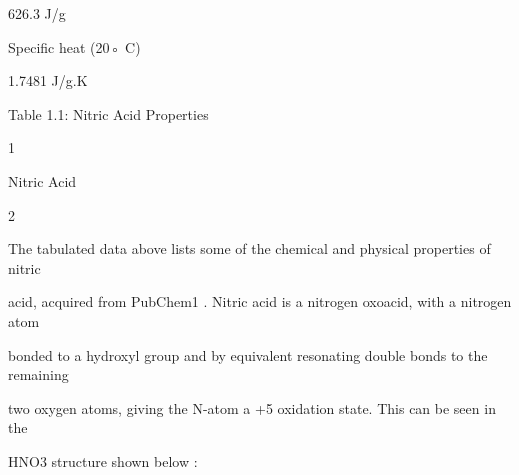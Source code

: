\documentclass[a4paper,portrait,12pt]{article}
\begin{document}
\begin{flushleft}
626.3 J/g
\end{flushleft}





\begin{flushleft}
Specific heat (20◦ C)
\end{flushleft}





\begin{flushleft}
1.7481 J/g.K
\end{flushleft}





\begin{flushleft}
Table 1.1: Nitric Acid Properties
\end{flushleft}





1





\begin{flushleft}
\newpage
Nitric Acid
\end{flushleft}





2





\begin{flushleft}
The tabulated data above lists some of the chemical and physical properties of nitric
\end{flushleft}


\begin{flushleft}
acid, acquired from PubChem1 . Nitric acid is a nitrogen oxoacid, with a nitrogen atom
\end{flushleft}


\begin{flushleft}
bonded to a hydroxyl group and by equivalent resonating double bonds to the remaining
\end{flushleft}


\begin{flushleft}
two oxygen atoms, giving the N-atom a +5 oxidation state. This can be seen in the
\end{flushleft}


\begin{flushleft}
HNO3 structure shown below :
\end{flushleft}
\end{document}
